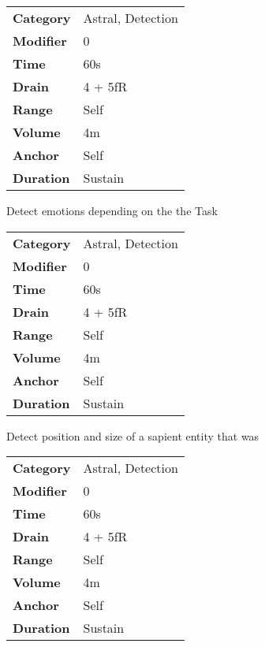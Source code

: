 
\begin{tabular}{ll}
    \textbf{Category} & Astral, Detection \\
    \textbf{Modifier} & 0                 \\
    \textbf{Time}     & 60s               \\
    \textbf{Drain}    & 4 + 5fR           \\
    \textbf{Range}    & Self              \\
    \textbf{Volume}   & 4m                \\
    \textbf{Anchor}   & Self              \\
    \textbf{Duration} & Sustain           \\
\end{tabular}

\hfil

Detect emotions depending on the the Task




\begin{tabular}{ll}
    \textbf{Category} & Astral, Detection \\
    \textbf{Modifier} & 0                 \\
    \textbf{Time}     & 60s               \\
    \textbf{Drain}    & 4 + 5fR           \\
    \textbf{Range}    & Self              \\
    \textbf{Volume}   & 4m                \\
    \textbf{Anchor}   & Self              \\
    \textbf{Duration} & Sustain           \\
\end{tabular}

\hfil

Detect position and size of a sapient entity that was


\begin{tabular}{ll}
    \textbf{Category} & Astral, Detection \\
    \textbf{Modifier} & 0                 \\
    \textbf{Time}     & 60s               \\
    \textbf{Drain}    & 4 + 5fR           \\
    \textbf{Range}    & Self              \\
    \textbf{Volume}   & 4m                \\
    \textbf{Anchor}   & Self              \\
    \textbf{Duration} & Sustain           \\
\end{tabular}

